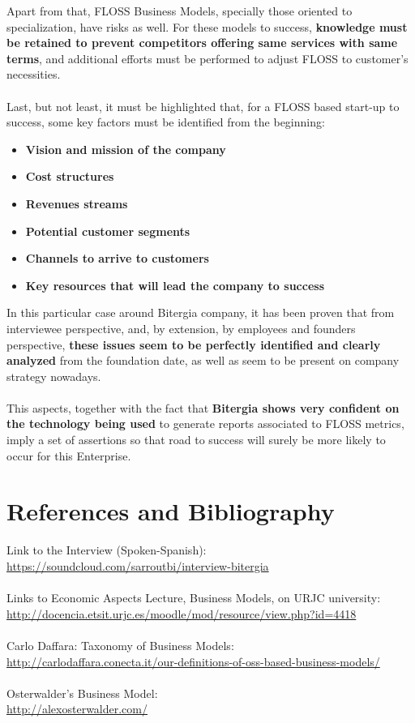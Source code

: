 \documentclass[11pt]{article}
\begin{document}
Apart from that, FLOSS Business Models, specially those oriented to specialization, have risks as well. For these models to success, \textbf{knowledge must be retained to prevent competitors offering same services with same terms}, and additional efforts must be performed to adjust FLOSS to customer's necessities.\\
\\
Last, but not least, it must be highlighted that, for a FLOSS based start-up to success, some key factors must be identified from the beginning:
\begin{itemize}\itemsep0.2pt
\item{\textbf{Vision and mission of the company}}
\item{\textbf{Cost structures}}
\item{\textbf{Revenues streams}}
\item{\textbf{Potential customer segments}}
\item{\textbf{Channels to arrive to customers}}
\item{\textbf{Key resources that will lead the company to success}}
\end{itemize}
In this particular case around Bitergia company, it has been proven that from interviewee perspective, and, by extension, by employees and founders perspective, \textbf{these issues seem to be perfectly identified and clearly analyzed} from the foundation date, as well as seem to be present on company strategy nowadays.\\
\\
This aspects, together with the fact that \textbf{Bitergia shows very confident on the technology being used} to generate reports associated to FLOSS metrics, imply a set of assertions so that road to success will surely be more likely to occur for this Enterprise.
\pagebreak
\section{References and Bibliography}
Link to the Interview (Spoken-Spanish):\\
\url{https://soundcloud.com/sarroutbi/interview-bitergia}\\
\\
Links to Economic Aspects Lecture, Business Models, on URJC university:\\
\url{http://docencia.etsit.urjc.es/moodle/mod/resource/view.php?id=4418}\\
\\
Carlo Daffara: Taxonomy of Business Models:\\
\url{http://carlodaffara.conecta.it/our-definitions-of-oss-based-business-models/}\\
\\
Osterwalder's Business Model:\\
\url{http://alexosterwalder.com/}\\
\end{document}
